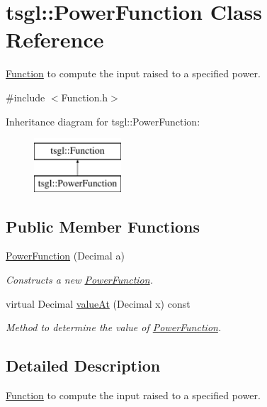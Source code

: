 \hypertarget{classtsgl_1_1_power_function}{\section{tsgl\-:\-:Power\-Function Class Reference}
\label{classtsgl_1_1_power_function}
}


\hyperlink{classtsgl_1_1_function}{Function} to compute the input raised to a specified power.  




{\ttfamily \#include $<$Function.\-h$>$}

Inheritance diagram for tsgl\-:\-:Power\-Function\-:\begin{figure}[H]
\begin{center}
\leavevmode
\includegraphics[height=2.000000cm]{classtsgl_1_1_power_function}
\end{center}
\end{figure}
\subsection*{Public Member Functions}
\begin{DoxyCompactItemize}
\item 
\hyperlink{classtsgl_1_1_power_function_a0a5d692e9bc9cf2a176ecab4ffc06519}{Power\-Function} (Decimal a)
\begin{DoxyCompactList}\small\item\em Constructs a new \hyperlink{classtsgl_1_1_power_function}{Power\-Function}. \end{DoxyCompactList}\item 
virtual Decimal \hyperlink{classtsgl_1_1_power_function_ae63821b4c2347508c42c300a0c306076}{value\-At} (Decimal x) const 
\begin{DoxyCompactList}\small\item\em Method to determine the value of \hyperlink{classtsgl_1_1_power_function}{Power\-Function}. \end{DoxyCompactList}\end{DoxyCompactItemize}


\subsection{Detailed Description}
\hyperlink{classtsgl_1_1_function}{Function} to compute the input raised to a specified power. 

